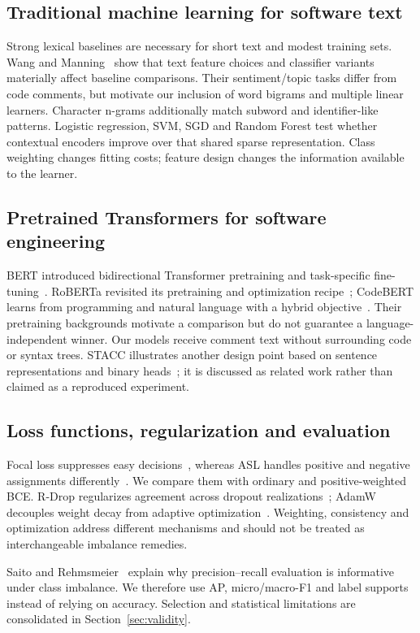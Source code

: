 \subsection{Traditional machine learning for software text}
Strong lexical baselines are necessary for short text and modest training sets. Wang and Manning~\cite{wang_manning} show that text feature choices and classifier variants materially affect baseline comparisons. Their sentiment/topic tasks differ from code comments, but motivate our inclusion of word bigrams and multiple linear learners. Character n-grams additionally match subword and identifier-like patterns. Logistic regression, SVM, SGD and Random Forest test whether contextual encoders improve over that shared sparse representation. Class weighting changes fitting costs; feature design changes the information available to the learner.

\subsection{Pretrained Transformers for software engineering}
BERT introduced bidirectional Transformer pretraining and task-specific fine-tuning~\cite{bert}. RoBERTa revisited its pretraining and optimization recipe~\cite{roberta}; CodeBERT learns from programming and natural language with a hybrid objective~\cite{codebert}. Their pretraining backgrounds motivate a comparison but do not guarantee a language-independent winner. Our models receive comment text without surrounding code or syntax trees. STACC illustrates another design point based on sentence representations and binary heads~\cite{stacc}; it is discussed as related work rather than claimed as a reproduced experiment.

\subsection{Loss functions, regularization and evaluation}
Focal loss suppresses easy decisions~\cite{focal}, whereas ASL handles positive and negative assignments differently~\cite{asl}. We compare them with ordinary and positive-weighted BCE. R-Drop regularizes agreement across dropout realizations~\cite{rdrop}; AdamW decouples weight decay from adaptive optimization~\cite{adamw}. Weighting, consistency and optimization address different mechanisms and should not be treated as interchangeable imbalance remedies.

Saito and Rehmsmeier~\cite{saito} explain why precision--recall evaluation is informative under class imbalance. We therefore use AP, micro/macro-F1 and label supports instead of relying on accuracy. Selection and statistical limitations are consolidated in Section~\ref{sec:validity}.

